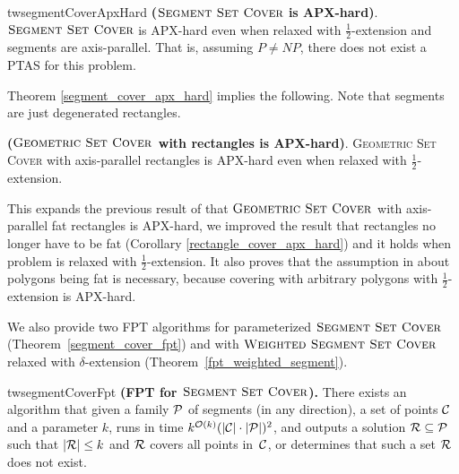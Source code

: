 \begin{restatable}{tw}{segmentCoverApxHard}{
\label{segment_cover_apx_hard}
	\textbf{($\textsc{Segment Set Cover}$ is APX-hard)}.	
	$\textsc{Segment Set Cover}$
	is APX-hard even when 
	relaxed with $\frac{1}{2}$-extension
	and segments are axis-parallel.
	That is, assuming $P\neq NP$, there does not exist a PTAS
	for this problem.
}\end{restatable}

Theorem \ref{segment_cover_apx_hard} implies the following.
Note that segments are just degenerated rectangles.

\begin{corollary}{
\label{rectangle_cover_apx_hard}
	\textbf{($\textsc{Geometric Set Cover}$ with rectangles is APX-hard)}.	
	\textsc{Geometric} \textsc{Set} \textsc{Cover}
	with axis-parallel rectangles is APX-hard
	even when relaxed with $\frac{1}{2}$-extension.
}\end{corollary}

This expands the previous result of \cite{rectangles_apx_hard} 
that $\textsc{Geometric Set Cover}$
with axis-parallel fat rectangles is APX-hard,
we improved the result that rectangles no longer
have to be fat (Corollary \ref{rectangle_cover_apx_hard})
and it holds when problem is relaxed with $\frac{1}{2}$-extension.
It also proves that the assumption in \cite{harpeled12}
about polygons being fat is necessary, because
covering with arbitrary polygons with $\frac{1}{2}$-extension is APX-hard.

We also provide two FPT algorithms for parameterized $\textsc{Segment Set Cover}$ 	
(Theorem~\ref{segment_cover_fpt})
and with $\textsc{Weighted Segment Set Cover}$ relaxed with $\delta$-extension
(Theorem~\ref{fpt_weighted_segment}).

\begin{restatable}{tw}{segmentCoverFpt}{
	\label{segment_cover_fpt}
	\textbf{(FPT for $\textsc{Segment Set Cover}$).}
	There exists an algorithm that given a family $\mathcal{P}$ of
	segments (in any direction),
	a set of points $\mathcal{C}$
	and a parameter $k$,
	runs in time ${k^{\mathcal{O}(k)} (|\mathcal{C}|\cdot|\mathcal{P}|)^2}$,
	and outputs a solution $\mathcal{R} \subseteq \mathcal{P}$
	such that $|\mathcal{R}| \le k$ and $\mathcal{R}$ covers all points in~$\mathcal{C}$,
	or determines that such a set $\mathcal{R}$ does not exist.
}\end{restatable}

